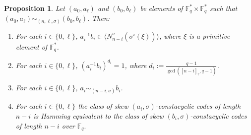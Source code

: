\documentclass[12pt,paper]{article}
\theoremstyle{plain}
\newtheorem{proposition}[theorem]{Proposition}
\newcommand{\Fq}{\mathbb{F}_{q}}
\begin{document}
\begin{proposition}\label{Eq_Consta}
Let $ (a_0, a_{\ell}) $ and $ (b_0, b_{\ell}) $ be elements of $ \Fq^{*} \times \Fq^{*} $ such that $ (a_0, a_{\ell}) \sim_{(n, \ell,\sigma)} (b_0, b_{\ell}) $. Then:
\begin{enumerate}
    \item For each $ i \in \{0, \ell\} $, $ a_i^{-1} b_i \in \langle N_{n-i}^{\sigma}(\sigma^i(\xi)) \rangle $, where $ \xi $ is a primitive element of $ \Fq^* $.
    \item For each $ i \in \{0, \ell\} $, $ (a_i^{-1} b_i)^{d_i} = 1 $, where $ d_i := \frac{q-1}{\gcd([n-i]_r, q-1)} $.
    \item For each $ i \in \{0, \ell\} $, $ a_i \sim_{(n-i,\sigma)} b_i $.
    \item For each $ i \in \{0, \ell\} $ the class of skew  $(a_i,\sigma)$-constacyclic codes of length $n-i$ is Hamming equivalent to the class of skew   $(b_i,\sigma)$-constacyclic codes of length $n-i$  over $\Fq.$
\end{enumerate}
\end{proposition}
\end{document}
